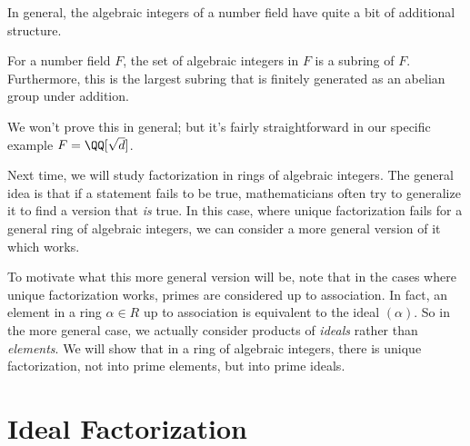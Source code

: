 In general, the algebraic integers of a number field have quite a bit of additional structure. 

\begin{theorem}
For a number field $F$, the set of algebraic integers in $F$ is a subring of $F$. Furthermore, this is the largest subring that is finitely generated as an abelian group under addition. 
\end{theorem}


We won't prove this in general; but it's fairly straightforward in our specific example $F = \QQ[\sqrt{d}]$.

Next time, we will study factorization in rings of algebraic integers. The general idea is that if a statement fails to be true, mathematicians often try to generalize it to find a version that \emph{is} true. In this case, where unique factorization fails for a general ring of algebraic integers, we can consider a more general version of it which works. 

To motivate what this more general version will be, note that in the cases where unique factorization works, primes are considered up to association. In fact, an element in a ring $\alpha \in R$ up to association is equivalent to the ideal $(\alpha)$. So in the more general case, we actually consider products of \emph{ideals} rather than \emph{elements}. We will show that in a ring of algebraic integers, there is unique factorization, not into prime elements, but into prime ideals. 



\section{Ideal Factorization}

